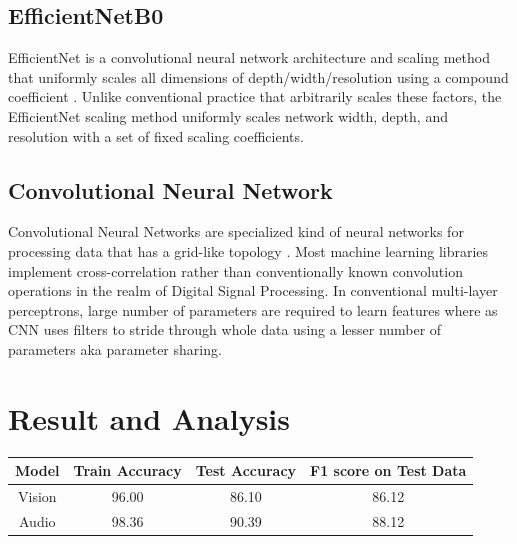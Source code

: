 \documentclass[fleqn, 10pt, twoside]{IOEGC}
\begin{document}
\subsection{EfficientNetB0}
EfficientNet is a convolutional neural network architecture and scaling method that uniformly scales all dimensions of depth/width/resolution using a compound coefficient \cite{r7}.
Unlike conventional practice that arbitrarily scales these factors, the EfficientNet scaling method uniformly scales network width, depth, and resolution with a set of fixed scaling
coefficients.
\par
\subsection{ Convolutional Neural Network}
Convolutional Neural Networks are specialized kind of neural networks for processing
data that has a grid-like topology \cite{r8}. Most machine learning libraries implement cross-correlation rather than conventionally known convolution operations in the realm of Digital
Signal Processing. In conventional multi-layer perceptrons, large number of parameters are required to learn features where as CNN uses filters to stride through whole data using a lesser number of parameters aka parameter sharing.

\section{Result and Analysis}

\begin{center}
	\begin{tabular}{ |c|c|c|c| }
		\hline
		Model  & Train Accuracy & Test Accuracy & F1 score on Test Data \\
		\hline
		Vision & 96.00          & 86.10         & 86.12                 \\
		\hline
		Audio  & 98.36          & 90.39         & 88.12                 \\

		\hline
	\end{tabular}
	\label{table:overview}
\end{center}
\end{document}
